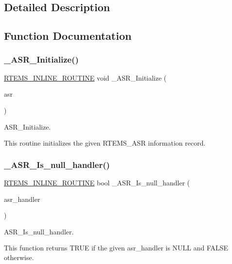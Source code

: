 \subsection{Detailed Description}


\subsection{Function Documentation}
\mbox{\label{group__ClassicASRImpl_gaa7563d887742cc52b9f280bbd91f4aef}} 
\subsubsection{\texorpdfstring{\_ASR\_Initialize()}{\_ASR\_Initialize()}}
{\footnotesize\ttfamily \mbox{\hyperlink{group__RTEMSScoreBaseDefs_gac216239df231d5dbd15e3520b0b9313f}{R\+T\+E\+M\+S\+\_\+\+I\+N\+L\+I\+N\+E\+\_\+\+R\+O\+U\+T\+I\+NE}} void \+\_\+\+A\+S\+R\+\_\+\+Initialize (\begin{DoxyParamCaption}\item[{\mbox{\hyperlink{structASR__Information}{A\+S\+R\+\_\+\+Information}} $\ast$}]{asr }\end{DoxyParamCaption})}



A\+S\+R\+\_\+\+Initialize. 

This routine initializes the given R\+T\+E\+M\+S\+\_\+\+A\+SR information record. \mbox{\label{group__ClassicASRImpl_ga719294d46adff2cf48f70292977f1546}} 
\subsubsection{\texorpdfstring{\_ASR\_Is\_null\_handler()}{\_ASR\_Is\_null\_handler()}}
{\footnotesize\ttfamily \mbox{\hyperlink{group__RTEMSScoreBaseDefs_gac216239df231d5dbd15e3520b0b9313f}{R\+T\+E\+M\+S\+\_\+\+I\+N\+L\+I\+N\+E\+\_\+\+R\+O\+U\+T\+I\+NE}} bool \+\_\+\+A\+S\+R\+\_\+\+Is\+\_\+null\+\_\+handler (\begin{DoxyParamCaption}\item[{\mbox{\hyperlink{group__ClassicASR_ga7277136adc52f70cdfd49c687ce37732}{rtems\+\_\+asr\+\_\+entry}}}]{asr\+\_\+handler }\end{DoxyParamCaption})}



A\+S\+R\+\_\+\+Is\+\_\+null\+\_\+handler. 

This function returns T\+R\+UE if the given asr\+\_\+handler is N\+U\+LL and F\+A\+L\+SE otherwise. 